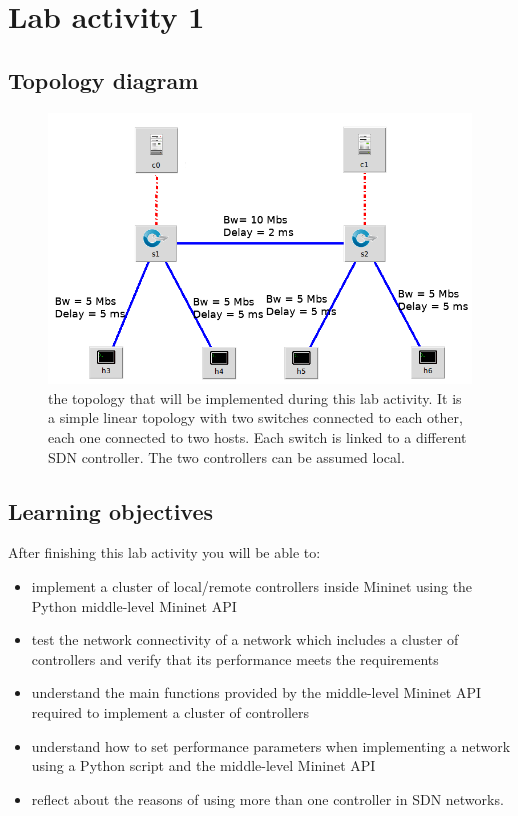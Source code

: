 \section*{Lab activity 1}

\subsection*{Topology diagram}
\begin{figure}[htb]
	\centering
	\includegraphics[width=0.8\linewidth]{img/topology-1.png}
	\caption{the topology that will be implemented during this lab activity.
  It is a simple linear topology with two switches connected to each other,
  each one connected to two hosts. Each switch is linked to a different
  SDN controller. The two controllers can be assumed local.}
	\label{fig:topology-1}
\end{figure}





\subsection*{Learning objectives}
After finishing this lab activity you will be able to:
\begin{itemize}
  \item implement a cluster of local/remote controllers inside Mininet using the Python
  middle-level Mininet API
  \item test the network connectivity of a network which
  includes a cluster of controllers and verify that its performance meets
	the requirements
  \item understand the main functions provided by the middle-level Mininet API required
  to implement a cluster of controllers
	\item understand how to set performance parameters when implementing a network
	using a Python script and the middle-level Mininet API
  \item reflect about the reasons of using more than one controller in SDN networks.
\end{itemize}






